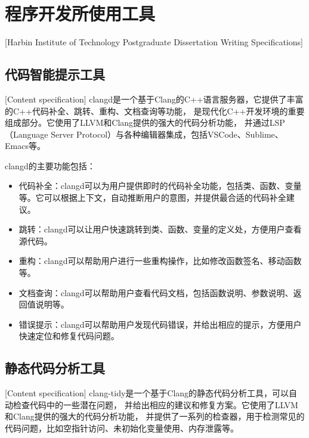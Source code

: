 

\chapter[程序开发使用工具]{程序开发所使用工具}[Harbin Institute of Technology Postgraduate Dissertation Writing Specifications]

\section{代码智能提示工具}[Content specification]
clangd是一个基于Clang的C++语言服务器，它提供了丰富的C++代码补全、跳转、重构、文档查询等功能，
是现代化C++开发环境的重要组成部分。它使用了LLVM和Clang提供的强大的代码分析功能，
并通过LSP（Language Server Protocol）与各种编辑器集成，包括VSCode、Sublime、Emacs等。

clangd的主要功能包括：

\begin{itemize}[itemindent=2em]
\item 代码补全：clangd可以为用户提供即时的代码补全功能，包括类、函数、变量等。它可以根据上下文，自动推断用户的意图，并提供最合适的代码补全建议。

\item 跳转：clangd可以让用户快速跳转到类、函数、变量的定义处，方便用户查看源代码。

\item 重构：clangd可以帮助用户进行一些重构操作，比如修改函数签名、移动函数等。

\item 文档查询：clangd可以帮助用户查看代码文档，包括函数说明、参数说明、返回值说明等。

\item 错误提示：clangd可以帮助用户发现代码错误，并给出相应的提示，方便用户快速定位和修复代码问题。
\end{itemize}


\section{静态代码分析工具}[Content specification]
clang-tidy是一个基于Clang的静态代码分析工具，可以自动检查代码中的一些潜在问题，
并给出相应的建议和修复方案。它使用了LLVM和Clang提供的强大的代码分析功能，
并提供了一系列的检查器，用于检测常见的代码问题，比如空指针访问、未初始化变量使用、内存泄露等。

